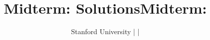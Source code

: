 \ifshow
	\newenvironment{floatInSolutions}[3][5.5in]{\begin{textblock*}{#1}(#2,#3) \begingroup \color{NavyBlue}}{\endgroup \end{textblock*}}
	\newenvironment{showInSolutions}{\begingroup \color{NavyBlue}}{\endgroup}
	\newenvironment{mcbox}[3][15]{\begin{pspicture}(0, 0)\psframe[linecolor = NavyBlue](0, #2)(#1, #3)}{\end{pspicture}}
	\title{Midterm: \partTitle{} Solutions}
\else
	\title{Midterm: \partTitle{}}
\fi

\DeclareMathOperator{\Lagr}{\mathcal{L}}

\author{Stanford University | \course{} | \term{}}
\date{\examDate{}}

\maketitle
